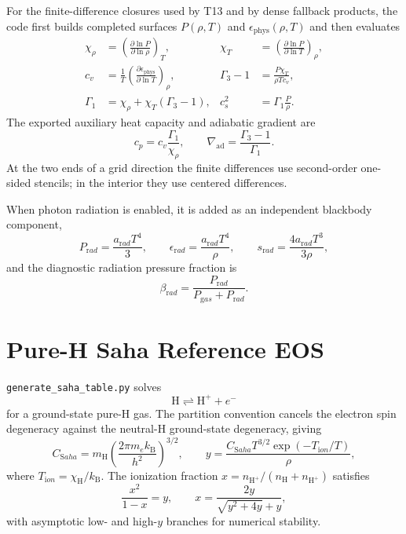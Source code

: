 \documentclass[11pt]{article}
\newcommand{\kb}{k_{\mathrm B}}
\newcommand{\arad}{a_{\mathrm rad}}
\newcommand{\me}{m_e}
\newcommand{\mh}{m_{\mathrm H}}
\newcommand{\eps}{\epsilon}
\newcommand{\gammathree}{\Gamma_3-1}
\begin{document}
For the finite-difference closures used by T13 and by dense fallback products,
the code first builds completed surfaces $P(\rho,T)$ and
$\eps_{\mathrm{phys}}(\rho,T)$ and then evaluates
\begin{align}
  \chi_\rho &= \left(\frac{\partial \ln P}{\partial \ln \rho}\right)_T,
&
  \chi_T &= \left(\frac{\partial \ln P}{\partial \ln T}\right)_\rho,
\\
  c_v &= \frac{1}{T}
        \left(\frac{\partial \eps_{\mathrm{phys}}}{\partial \ln T}\right)_\rho,
&
  \gammathree &= \frac{P\chi_T}{\rho T c_v},
\\
  \Gamma_1 &= \chi_\rho + \chi_T(\Gamma_3-1),
&
  c_s^2 &= \Gamma_1\frac{P}{\rho}.
\end{align}
The exported auxiliary heat capacity and adiabatic gradient are
\begin{equation}
  c_p = c_v\frac{\Gamma_1}{\chi_\rho},
  \qquad
  \nabla_{\mathrm{ad}} = \frac{\Gamma_3-1}{\Gamma_1}.
\end{equation}
At the two ends of a grid direction the finite differences use second-order
one-sided stencils; in the interior they use centered differences.

When photon radiation is enabled, it is added as an independent blackbody
component,
\begin{equation}
  P_{\mathrm rad} = \frac{\arad T^4}{3}, \qquad
  \eps_{\mathrm rad} = \frac{\arad T^4}{\rho}, \qquad
  s_{\mathrm rad} = \frac{4\arad T^3}{3\rho},
\end{equation}
and the diagnostic radiation pressure fraction is
\begin{equation}
  \beta_{\mathrm rad} =
  \frac{P_{\mathrm rad}}{P_{\mathrm gas}+P_{\mathrm rad}}.
\end{equation}

\section{Pure-H Saha Reference EOS}

\texttt{generate\_saha\_table.py} solves
\begin{equation}
  \mathrm H \rightleftharpoons \mathrm{H^+}+e^-
\end{equation}
for a ground-state pure-H gas.  The partition convention cancels the electron
spin degeneracy against the neutral-H ground-state degeneracy, giving
\begin{equation}
  C_{\mathrm Saha} =
  \mh\left(\frac{2\pi\me\kb}{h^2}\right)^{3/2},
  \qquad
  y =
  \frac{C_{\mathrm Saha}T^{3/2}\exp(-T_{\mathrm ion}/T)}{\rho},
\end{equation}
where $T_{\mathrm ion}=\chi_{\mathrm H}/\kb$.  The ionization fraction
$x=n_{\mathrm{H^+}}/(n_{\mathrm H}+n_{\mathrm{H^+}})$ satisfies
\begin{equation}
  \frac{x^2}{1-x}=y,
  \qquad
  x = \frac{2y}{\sqrt{y^2+4y}+y},
\end{equation}
with asymptotic low- and high-$y$ branches for numerical stability.
\end{document}
